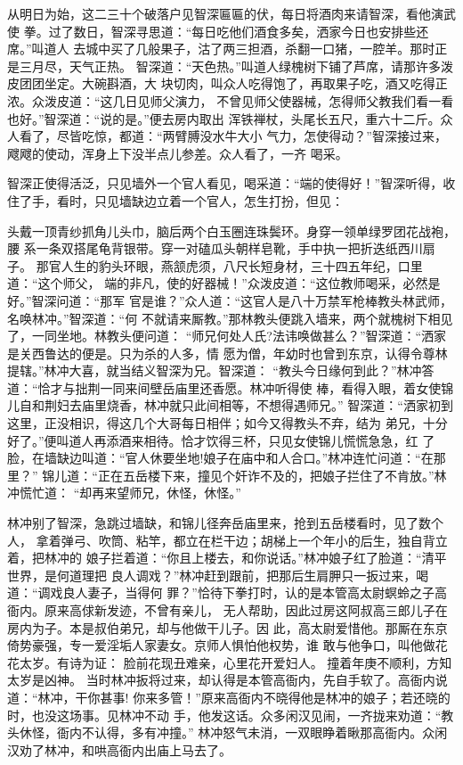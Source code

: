 从明日为始，这二三十个破落户见智深匾匾的伏，每日将酒肉来请智深，看他演武使
拳。过了数日，智深寻思道：“每日吃他们酒食多矣，洒家今日也安排些还席。”叫道人
去城中买了几般果子，沽了两三担酒，杀翻一口猪，一腔羊。那时正是三月尽，天气正热。
智深道：“天色热。”叫道人绿槐树下铺了芦席，请那许多泼皮团团坐定。大碗斟酒，大
块切肉，叫众人吃得饱了，再取果子吃，酒又吃得正浓。众泼皮道：“这几日见师父演力，
不曾见师父使器械，怎得师父教我们看一看也好。”智深道：“说的是。”便去房内取出
浑铁禅杖，头尾长五尺，重六十二斤。众人看了，尽皆吃惊，都道：“两臂膊没水牛大小
气力，怎使得动？”智深接过来，飕飕的使动，浑身上下没半点儿参差。众人看了，一齐
喝采。

智深正使得活泛，只见墙外一个官人看见，喝采道：“端的使得好！”智深听得，收
住了手，看时，只见墙缺边立着一个官人，怎生打扮，但见：

头戴一顶青纱抓角儿头巾，脑后两个白玉圈连珠鬓环。身穿一领单绿罗团花战袍，腰
系一条双搭尾龟背银带。穿一对磕瓜头朝样皂靴，手中执一把折迭纸西川扇子。
那官人生的豹头环眼，燕颔虎须，八尺长短身材，三十四五年纪，口里道：“这个师父，
端的非凡，使的好器械！”众泼皮道：“这位教师喝采，必然是好。”智深问道：“那军
官是谁？”众人道：“这官人是八十万禁军枪棒教头林武师，名唤林冲。”智深道：“何
不就请来厮教。”那林教头便跳入墙来，两个就槐树下相见了，一同坐地。林教头便问道：
“师兄何处人氏?法讳唤做甚么？”智深道：“洒家是关西鲁达的便是。只为杀的人多，情
愿为僧，年幼时也曾到东京，认得令尊林提辖。”林冲大喜，就当结义智深为兄。智深道：
“教头今日缘何到此？”林冲答道：“恰才与拙荆一同来间壁岳庙里还香愿。林冲听得使
棒，看得入眼，着女使锦儿自和荆妇去庙里烧香，林冲就只此间相等，不想得遇师兄。”
智深道：“洒家初到这里，正没相识，得这几个大哥每日相伴；如今又得教头不弃，结为
弟兄，十分好了。”便叫道人再添酒来相待。恰才饮得三杯，只见女使锦儿慌慌急急，红
了脸，在墙缺边叫道：“官人休要坐地!娘子在庙中和人合口。”林冲连忙问道：“在那里？”
锦儿道：“正在五岳楼下来，撞见个奸诈不及的，把娘子拦住了不肯放。”林冲慌忙道：
“却再来望师兄，休怪，休怪。”

林冲别了智深，急跳过墙缺，和锦儿径奔岳庙里来，抢到五岳楼看时，见了数个人，
拿着弹弓、吹筒、粘竿，都立在栏干边；胡梯上一个年小的后生，独自背立着，把林冲的
娘子拦着道：“你且上楼去，和你说话。”林冲娘子红了脸道：“清平世界，是何道理把
良人调戏？”林冲赶到跟前，把那后生肩胛只一扳过来，喝道：“调戏良人妻子，当得何
罪？”恰待下拳打时，认的是本管高太尉螟蛉之子高衙内。原来高俅新发迹，不曾有亲儿，
无人帮助，因此过房这阿叔高三郎儿子在房内为子。本是叔伯弟兄，却与他做干儿子。因
此，高太尉爱惜他。那厮在东京倚势豪强，专一爱淫垢人家妻女。京师人惧怕他权势，谁
敢与他争口，叫他做花花太岁。有诗为证：
脸前花现丑难亲，心里花开爱妇人。
撞着年庚不顺利，方知太岁是凶神。
当时林冲扳将过来，却认得是本管高衙内，先自手软了。高衙内说道：“林冲，干你甚事!
你来多管！”原来高衙内不晓得他是林冲的娘子；若还晓的时，也没这场事。见林冲不动
手，他发这话。众多闲汉见闹，一齐拢来劝道：“教头休怪，衙内不认得，多有冲撞。”
林冲怒气未消，一双眼睁着瞅那高衙内。众闲汉劝了林冲，和哄高衙内出庙上马去了。

